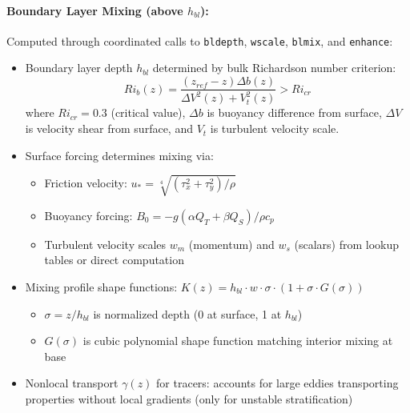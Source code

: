\documentclass[11pt, a4paper]{article}
\begin{document}
\paragraph{Boundary Layer Mixing (above $h_{bl}$):} Computed through coordinated calls to \texttt{bldepth}, \texttt{wscale}, \texttt{blmix}, and \texttt{enhance}:
\begin{itemize}
    \item Boundary layer depth $h_{bl}$ determined by bulk Richardson number criterion:
    \begin{equation}
    Ri_b(z) = \frac{(z_{ref} - z) \Delta b(z)}{\Delta V^2(z) + V_t^2(z)} > Ri_{cr}
    \end{equation}
    where $Ri_{cr} = 0.3$ (critical value), $\Delta b$ is buoyancy difference from surface, $\Delta V$ is velocity shear from surface, and $V_t$ is turbulent velocity scale.

    \item Surface forcing determines mixing via:
    \begin{itemize}
        \item Friction velocity: $u_* = \sqrt[4]{(\tau_x^2 + \tau_y^2)/\rho}$
        \item Buoyancy forcing: $B_0 = -g(\alpha Q_T + \beta Q_S)/\rho c_p$
        \item Turbulent velocity scales $w_m$ (momentum) and $w_s$ (scalars) from lookup tables or direct computation
    \end{itemize}

    \item Mixing profile shape functions: $K(z) = h_{bl} \cdot w \cdot \sigma \cdot (1 + \sigma \cdot G(\sigma))$
    \begin{itemize}
        \item $\sigma = z/h_{bl}$ is normalized depth (0 at surface, 1 at $h_{bl}$)
        \item $G(\sigma)$ is cubic polynomial shape function matching interior mixing at base
    \end{itemize}

    \item Nonlocal transport $\gamma(z)$ for tracers: accounts for large eddies transporting properties without local gradients (only for unstable stratification)
\end{itemize}
\end{document}
